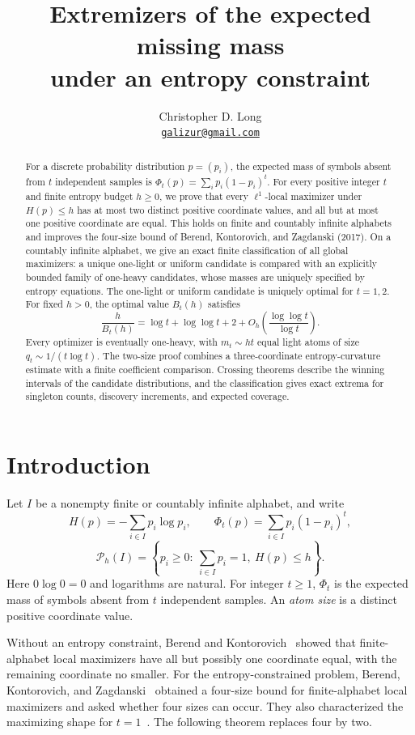 \documentclass[11pt]{article}
\title{Extremizers of the expected missing mass\\under an entropy constraint}
\author{Christopher D. Long\\[3pt]
 \small\href{mailto:galizur@gmail.com}{\texttt{galizur@gmail.com}}}
\date{}
\numberwithin{equation}{section}
\begin{document}
\maketitle
\begin{abstract}
For a discrete probability distribution $p=(p_i)$, the expected mass of
symbols absent from $t$ independent samples is
$\Phi_t(p)=\sum_i p_i(1-p_i)^t$. For every positive integer $t$ and finite
entropy budget $h\ge0$, we prove that every $\ell^1$-local maximizer under
$H(p)\le h$ has at most two distinct positive coordinate values, and all
but at most one positive coordinate are equal. This holds on finite and
countably infinite alphabets and improves the four-size bound of Berend,
Kontorovich, and Zagdanski (2017). On a countably infinite alphabet, we give
an exact finite classification of all global maximizers: a unique
one-light or uniform candidate is compared with an explicitly bounded
family of one-heavy candidates, whose masses are uniquely specified by
entropy equations. The one-light or uniform candidate is uniquely optimal
for $t=1,2$. For fixed $h>0$, the optimal value $B_t(h)$ satisfies
\[
 \frac{h}{B_t(h)}=\log t+\log\log t+2
       +O_h\!\left(\frac{\log\log t}{\log t}\right).
\]
Every optimizer is eventually one-heavy, with $m_t\sim ht$ equal light
atoms of size $q_t\sim1/(t\log t)$. The two-size proof combines a
three-coordinate entropy-curvature estimate with a finite coefficient
comparison. Crossing theorems describe the winning intervals of the
candidate distributions, and the classification gives exact extrema for
singleton counts, discovery increments, and expected coverage.
\end{abstract}

\section{Introduction}
Let $I$ be a nonempty finite or countably infinite alphabet, and write
\[
 H(p)=-\sum_{i\in I}p_i\log p_i,\qquad
 \Phi_t(p)=\sum_{i\in I}p_i(1-p_i)^t,
\]
\[
 \mathcal P_h(I)=\left\{p_i\ge0:\ \sum_{i\in I}p_i=1,\ H(p)\le h\right\}.
\]
Here $0\log0=0$ and logarithms are natural. For integer $t\ge1$, $\Phi_t$
is the expected mass of symbols absent from $t$ independent samples.
An \emph{atom size} is a distinct positive coordinate value.

Without an entropy constraint, Berend and Kontorovich~\cite{BK} showed that
finite-alphabet local maximizers have all but possibly one coordinate equal,
with the remaining coordinate no smaller. For the entropy-constrained
problem, Berend, Kontorovich, and Zagdanski~\cite[Theorem~1]{BKZ} obtained a
four-size bound for finite-alphabet local maximizers and asked whether four
sizes can occur. They also characterized the maximizing shape for
$t=1$~\cite[Proposition~3]{BKZ}. The following theorem replaces four by two.
\end{document}
